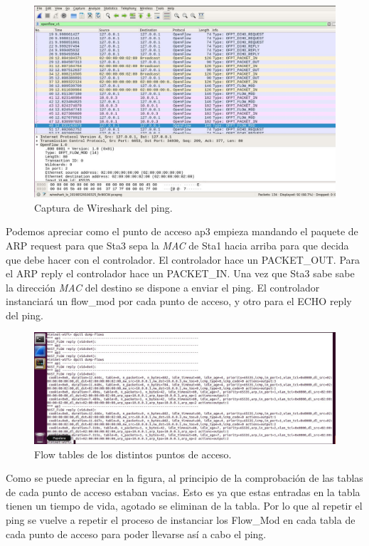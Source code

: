 \begin{figure}[!htb]
  \centering
    \includegraphics[width=\linewidth]{./img/16.JPG}
    \caption{Captura de Wireshark del ping.}
  \label{fig:yo}
\end{figure}
\newpage
Podemos apreciar como el punto de acceso ap3 empieza mandando el paquete de ARP request para que Sta3 sepa la \textit{MAC} de Sta1 hacia arriba para que decida que debe hacer con el controlador. El controlador hace un PACKET\_OUT. Para el ARP reply el controlador hace un PACKET\_IN. Una vez que Sta3 sabe sabe la dirección \textit{MAC} del destino se dispone a enviar el ping. El controlador instanciará un flow\_mod por cada punto de acceso, y otro para el ECHO reply del ping.

\begin{figure}[!htb]
  \centering
    \includegraphics[width=\linewidth]{./img/17.JPG}
    \caption{Flow tables de los distintos puntos de acceso.}
  \label{fig:yo}
\end{figure}
\newline
Como se puede apreciar en la figura, al principio de la comprobación de las tablas de cada punto de acceso estaban vacias. Esto es ya que estas entradas en la tabla tienen un tiempo de vida, agotado se eliminan de la tabla. Por lo que al repetir el ping se vuelve a repetir el proceso de instanciar los Flow\_Mod en cada tabla de cada punto de acceso para poder llevarse así a cabo el ping. \newline
\newline

